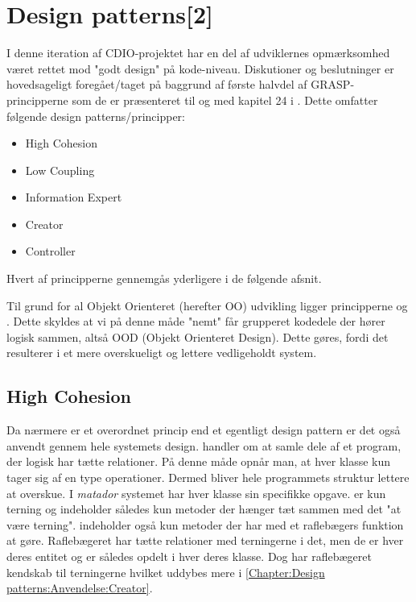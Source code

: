 \chapter{Design patterns[2]}\label{Chapter:Design patterns}
I denne iteration af CDIO-projektet \cite{CDIOdel2} har en del af udviklernes opmærksomhed været rettet mod "godt design" på kode-niveau. Diskutioner og beslutninger er hovedsageligt foregået/taget på baggrund af første halvdel af GRASP-principperne som de er præsenteret til og med kapitel 24 i \cite{umlbook}. Dette omfatter følgende design patterns/principper: 

\begin{itemize}
	\item High Cohesion    
	\item Low Coupling
	\item Information Expert
	\item Creator
	\item Controller
\end{itemize}





Hvert af principperne gennemgås yderligere i de følgende afsnit.

Til grund for al Objekt Orienteret (herefter OO) udvikling ligger principperne  og . Dette skyldes at vi på denne måde "nemt" får grupperet kodedele der hører logisk sammen, altså OOD (Objekt Orienteret Design). Dette gøres, fordi det resulterer i et mere overskueligt og lettere vedligeholdt system.

\section{High Cohesion}\label{Chapter:Design patterns:Anvendelse:High Cohesion}
Da  nærmere er et overordnet princip end et egentligt design pattern er det også anvendt gennem hele systemets design.  handler om at samle dele af et program, der logisk har tætte relationer. På denne måde opnår man, at hver klasse kun tager sig af en type operationer. Dermed bliver hele programmets struktur lettere at overskue. I \textit{matador} systemet har hver klasse sin specifikke opgave.  er kun terning og indeholder således kun metoder der hænger tæt sammen med det "at være terning".  indeholder også kun metoder der har med et raflebægers funktion at gøre. Raflebægeret har tætte relationer med terningerne i det, men de er hver deres entitet og er således opdelt i hver deres klasse. Dog har raflebægeret kendskab til terningerne hvilket uddybes mere i \vref{Chapter:Design patterns:Anvendelse:Creator}.       

